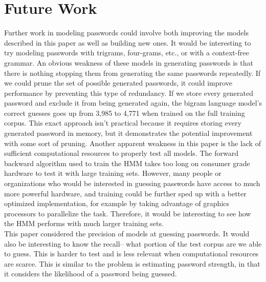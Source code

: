 \documentclass{amsart}
\theoremstyle{definition}
\theoremstyle{remark}
\numberwithin{equation}{section}
\begin{document}
\section{Future Work}
Further work in modeling passwords could involve both improving the models described in this paper as well as building new ones. It would be interesting to try modeling passwords with trigrams, four-grams, etc., or with a context-free grammar. An obvious weakness of these models in generating passwords is that there is nothing stopping them from generating the same passwords repeatedly. If we could prune the set of possible generated passwords, it could improve performance by preventing this type of redundancy. If we store every generated password and exclude it from being generated again, the bigram language model's correct guesses goes up from 3,985 to 4,771 when trained on the full training corpus. This exact approach isn't practical because it requires storing every generated password in memory, but it demonstrates the potential improvement with some sort of pruning. Another apparent weakness in this paper is the lack of sufficient computational resources to properly test all models. The forward backward algorithm used to train the HMM takes too long on consumer grade hardware to test it with large training sets. However, many people or organizations who would be interested in guessing passwords have access to much more powerful hardware, and training could be further sped up with a better optimized implementation, for example by taking advantage of graphics processors to parallelize the task. Therefore, it would be interesting to see how the HMM performs with much larger training sets.\\
This paper considered the precision of models at guessing passwords. It would also be interesting to know the recall-- what portion of the test corpus are we able to guess. This is harder to test and is less relevant when computational resources are scarce. This is similar to the problem is estimating password strength, in that it considers the likelihood of a password being guessed.
\end{document}
